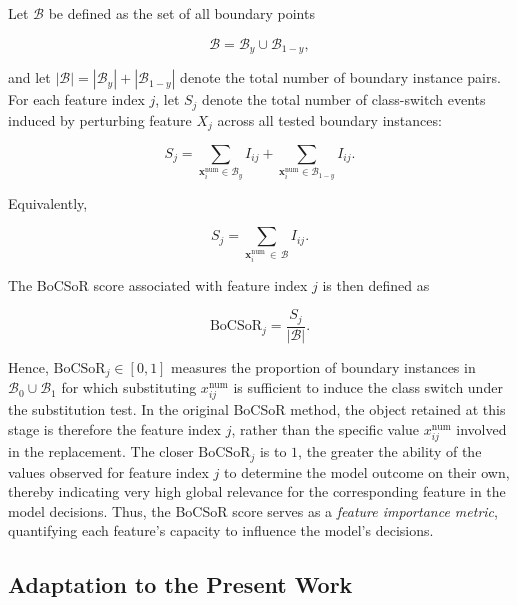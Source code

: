 Let $\mathcal{B}$ be defined as the set of all boundary points 

\begin{equation}
  \mathcal{B} = \mathcal{B}_y \cup \mathcal{B}_{1-y},
\end{equation}

and let $|\mathcal{B}| = |\mathcal{B}_y| + |\mathcal{B}_{1-y}|$ denote the total number of boundary instance pairs. For each feature index $j$, let $S_j$ denote the total number of class-switch events induced by perturbing feature $X_j$ across all tested boundary instances:

\begin{equation}
  S_j = \sum_{\mathbf{x}^{\mathrm{num}}_i \in \mathcal{B}_y} I_{ij} + \sum_{\mathbf{x}^{\mathrm{num}}_i \in \mathcal{B}_{1-y}} I_{ij}.
\end{equation}

Equivalently,

\begin{equation}
  S_j = \sum_{\mathbf{x}^{\mathrm{num}}_i \, \in \, \mathcal{B}} I_{ij}.
\end{equation}

The BoCSoR score associated with feature index $j$ is then defined as

\begin{equation}
  \mathrm{BoCSoR}_j = \frac{S_j}{|\mathcal{B}|}.
\end{equation}

Hence, $\mathrm{BoCSoR}_j \in [0,1]$ measures the proportion of boundary instances in $\mathcal{B}_0 \cup \mathcal{B}_1$ for which substituting $x_{ij}^{\mathrm{num}}$ is sufficient to induce the class switch under the substitution test. In the original BoCSoR method, the object retained at this stage is therefore the feature index $j$, rather than the specific value $x_{ij}^{\mathrm{num}}$ involved in the replacement. The closer $\mathrm{BoCSoR}_j$ is to $1$, the greater the ability of the values observed for feature index $j$ to determine the model outcome on their own, thereby indicating very high global relevance for the corresponding feature in the model decisions. Thus, the BoCSoR score serves as a \textit{feature importance metric}, quantifying each feature's capacity to influence the model's decisions.

\subsection{Adaptation to the Present Work}

